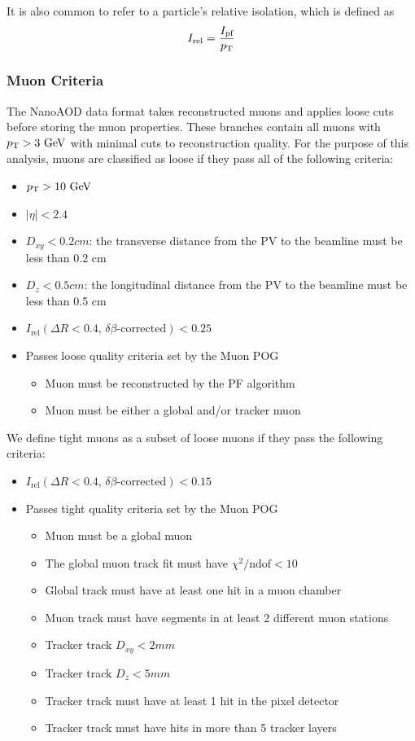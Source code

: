 It is also common to refer to a particle's relative isolation, which is defined as
\begin{equation}
	\label{eq:reliso}
	I_\text{rel}=\frac{I_\text{pf}}{\pt}
\end{equation}

\subsubsection{Muon Criteria} \label{sec:ana_muons}
The NanoAOD data format takes reconstructed muons and applies loose cuts before storing the muon properties. These branches contain all muons with $\pt>3\unit{GeV}$ with minimal cuts to reconstruction quality. For the purpose of this analysis, muons are classified as loose if they pass all of the following criteria:
\begin{itemize}
	\item $\pt>10\unit{GeV}$
	\item $|\eta|<2.4$
	\item $D_{xy}<0.2\unit{cm}$: the transverse distance from the PV to the beamline must be less than 0.2 cm
	\item $D_{z}<0.5\unit{cm}$: the longitudinal distance from the PV to the beamline must be less than 0.5 cm
	\item $I_\text{rel}(\Delta R<0.4,\,\delta\beta\text{-corrected})<0.25$
	\item Passes loose quality criteria set by the Muon POG
	\begin{itemize}
		\item Muon must be reconstructed by the PF algorithm
		\item Muon must be either a global and/or tracker muon
	\end{itemize}
\end{itemize}
We define tight muons as a subset of loose muons if they pass the following criteria:
\begin{itemize}
	\item $I_\text{rel}(\Delta R<0.4,\,\delta\beta\text{-corrected})<0.15$
	\item Passes tight quality criteria set by the Muon POG
	\begin{itemize}
		\item Muon must be a global muon
		\item The global muon track fit must have $\chi^2/\text{ndof}<10$
		\item Global track must have at least one hit in a muon chamber %
		\item Muon track must have segments in at least 2 different muon stations %
		\item Tracker track $D_{xy}<2\unit{mm}$
		\item Tracker track $D_{z}<5\unit{mm}$
		\item Tracker track must have at least 1 hit in the pixel detector
		\item Tracker track must have hits in more than 5 tracker layers
	\end{itemize}
\end{itemize}
